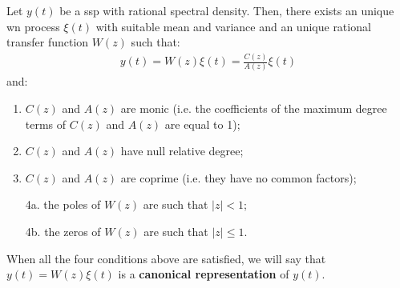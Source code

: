 
\begin{thm}
	Let $y(t)$ be a \gls{ssp} with rational spectral density. 
	Then, there exists an unique \gls{wn} process $\xi(t)$ with suitable mean and variance and an unique rational transfer function $W(z)$ such that:
	\begin{align*}
		y(t) = W(z)\xi(t)=\frac{C(z)}{A(z)}\xi(t)
	\end{align*}
    and:
    \begin{enumerate}
		\item $C(z)$ and $A(z)$ are monic (i.e. the coefficients of the maximum degree terms of $C(z)$ and $A(z)$ are equal to 1);
		\item $C(z)$ and $A(z)$ have null relative degree;
		\item $C(z)$ and $A(z)$ are coprime (i.e. they have no common factors);
		\item[4a.]the poles of $W(z)$ are such that $|z|< 1$;
		\item[4b.]the zeros of $W(z)$ are such that $|z|\leq 1$.
    \end{enumerate}
\end{thm}

When all the four conditions above are satisfied, we will say that $y(t) = W(z)\xi(t)$ is a \textbf{canonical representation} of $y(t)$.

